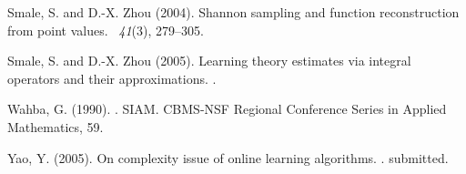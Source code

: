 \documentclass[twoside,11pt]{amsart}
\theoremstyle{theorem}
\theoremstyle{definition}
\theoremstyle{remark}
\begin{document}
\begin{thebibliography}{}
{\sc Smale, S.} and {\sc D.-X. Zhou} (2004).
\newblock Shannon sampling and function reconstruction from point values.
~{\em 41\/}(3), 279--305.

{\sc Smale, S.} and {\sc D.-X. Zhou} (2005).
\newblock Learning theory estimates via integral operators and their
  approximations.
.

{\sc Wahba, G.} (1990).
.
\newblock SIAM.
\newblock CBMS-NSF Regional Conference Series in Applied Mathematics, 59.

{\sc Yao, Y.} (2005).
\newblock On complexity issue of online learning algorithms.
.
\newblock submitted.

\end{thebibliography}
\end{document}
